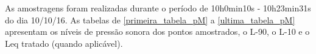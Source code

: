 
\begin{SingleSpace}
As amostragens foram realizadas durante o período de 10h0min10s - 10h23min31s do dia 10/10/16. As tabelas de \ref{primeira_tabela_pM} a \ref{ultima_tabela_pM} apresentam os níveis de pressão sonora dos pontos amostrados, o L-90, o L-10 e o Leq tratado (quando aplicável). \\\end{SingleSpace} 
